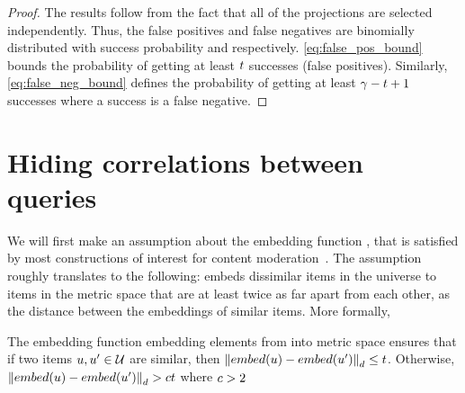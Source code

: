 \begin{proof}
The results follow from the fact that all of the projections are selected independently. Thus, the false positives and false negatives are binomially distributed with success probability \fpr and \fnr respectively. \eqref{eq:false_pos_bound} bounds the probability of getting at least $t$ successes (false positives). 
Similarly, \eqref{eq:false_neg_bound} defines the probability of getting at least $\gamma - t + 1$ successes where a success is a false negative. 

\end{proof}

\fi 


\iffalse
\section{Hiding correlations between queries}
\label{app:hiding_corr}
%


We will first make an assumption about the embedding function \embed, that is satisfied by most constructions of interest for content moderation~\cite{mckeown2023hamming,kulshrestha2021identifying}. The assumption roughly translates to the following: \embed embeds dissimilar items in the universe \universe to items in the metric space that are at least twice as far apart from each other, as the distance between the embeddings of similar items. 
More formally, 

\begin{assumption}
\label{assumption1}
The embedding function \embed embedding elements from \universe into metric space ensures that if two items $u, u' \in \mathcal{U}$ are similar, then $\distanceNotation[\distance][\embed(\genericUniverseElmt) - \embed(\genericUniverseElmtAlt)] \le \threshold$. Otherwise, 
$\distanceNotation[\distance][\embed(\genericUniverseElmt) - \embed(\genericUniverseElmtAlt)] > \lshConst\threshold$ where $c > 2$ 
\end{assumption}

